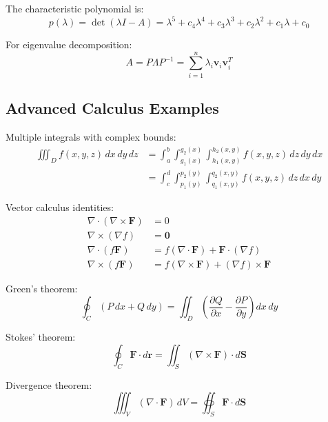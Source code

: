 \documentclass[12pt]{article}
\begin{document}
The characteristic polynomial is:
\begin{equation}
p(\lambda) = \det(\lambda I - A) = \lambda^5 + c_4\lambda^4 + c_3\lambda^3 + c_2\lambda^2 + c_1\lambda + c_0
\end{equation}

For eigenvalue decomposition:
\begin{equation}
A = P \Lambda P^{-1} = \sum_{i=1}^{n} \lambda_i \mathbf{v}_i \mathbf{v}_i^T
\end{equation}

\subsection{Advanced Calculus Examples}

Multiple integrals with complex bounds:
\begin{align}
\iiint_D f(x,y,z) \, dx \, dy \, dz &= \int_a^b \int_{g_1(x)}^{g_2(x)} \int_{h_1(x,y)}^{h_2(x,y)} f(x,y,z) \, dz \, dy \, dx \\
&= \int_c^d \int_{p_1(y)}^{p_2(y)} \int_{q_1(x,y)}^{q_2(x,y)} f(x,y,z) \, dz \, dx \, dy
\end{align}

Vector calculus identities:
\begin{align}
\nabla \cdot (\nabla \times \mathbf{F}) &= 0 \\
\nabla \times (\nabla f) &= \mathbf{0} \\
\nabla \cdot (f\mathbf{F}) &= f(\nabla \cdot \mathbf{F}) + \mathbf{F} \cdot (\nabla f) \\
\nabla \times (f\mathbf{F}) &= f(\nabla \times \mathbf{F}) + (\nabla f) \times \mathbf{F}
\end{align}

Green's theorem:
\begin{equation}
\oint_C (P \, dx + Q \, dy) = \iint_D \left(\frac{\partial Q}{\partial x} - \frac{\partial P}{\partial y}\right) dx \, dy
\end{equation}

Stokes' theorem:
\begin{equation}
\oint_C \mathbf{F} \cdot d\mathbf{r} = \iint_S (\nabla \times \mathbf{F}) \cdot d\mathbf{S}
\end{equation}

Divergence theorem:
\begin{equation}
\iiint_V (\nabla \cdot \mathbf{F}) \, dV = \oiint_S \mathbf{F} \cdot d\mathbf{S}
\end{equation}
\end{document}
